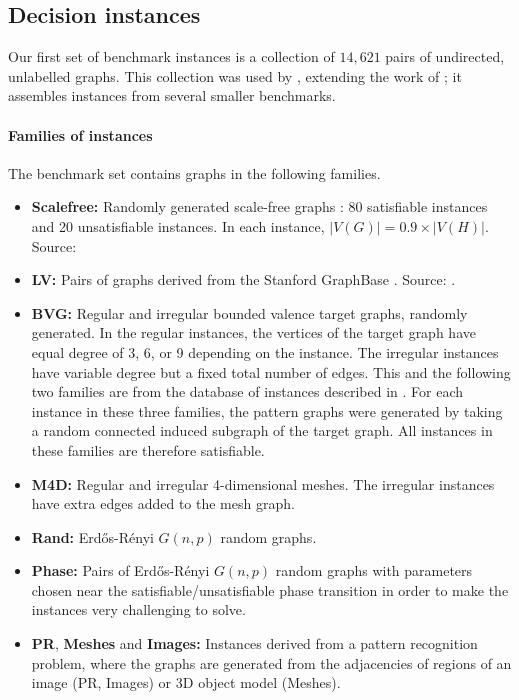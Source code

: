 \subsection{Decision instances}\label{subsec:si-decision-experiment}

Our first set of benchmark instances is
a collection of $14,621$ pairs of undirected, unlabelled graphs.
This collection was used by \citet{DBLP:conf/cpaior/ArchibaldDHMP019},
extending the work of \citet{DBLP:conf/lion/KotthoffMS16};
it assembles instances from several smaller benchmarks.

\paragraph*{Families of instances} The benchmark set contains graphs
in the following families.

\begin{itemize}
    \item
        \textbf{Scalefree:} Randomly generated scale-free graphs \citep{DBLP:books/daglib/0012457}: 80
        satisfiable instances and 20 unsatisfiable instances.  In each instance,
        $|V(G)| = 0.9 \times |V(H)|$. Source: \citet{DBLP:journals/constraints/ZampelliDS10}
    \item
        \textbf{LV:} Pairs of graphs derived from the Stanford GraphBase \citep{DBLP:books/daglib/0071477}.
        Source: \cite{DBLP:journals/mscs/LarrosaV02}.
    \item \textbf{BVG:} Regular and irregular bounded valence target graphs, randomly generated.
        In the regular instances, the vertices of the target graph have equal degree of 3, 6, or 9
        depending on the instance.  The irregular instances have variable degree but a fixed total
        number of edges.
        This and the following two families are from the database
        of instances described in \citet{DBLP:journals/prl/SantoFSV03}.  For each instance in these
        three families, the pattern graphs were generated by taking a random connected
        induced subgraph of the target graph. All instances in these families are therefore satisfiable.
    \item \textbf{M4D:} Regular and irregular 4-dimensional meshes.  The irregular instances have
        extra edges added to the mesh graph.
    \item \textbf{Rand:} Erd\H{o}s-Rényi $G(n,p)$ random graphs.
    \item \textbf{Phase:} Pairs of Erd\H{o}s-Rényi $G(n,p)$ random graphs
        with parameters chosen near the satisfiable/unsatisfiable phase transition in order
        to make the instances very challenging to solve.
        \citep{DBLP:journals/jair/McCreeshPST18}
    \item \textbf{PR}, \textbf{Meshes} and \textbf{Images:} Instances derived from a pattern recognition problem, where
    	the graphs are generated from the adjacencies of regions of an image (PR, Images)
	or 3D object model (Meshes). \citep{DBLP:journals/pr/SolnonDHJ15,DBLP:journals/cviu/DamiandSHJS11}
\end{itemize}

